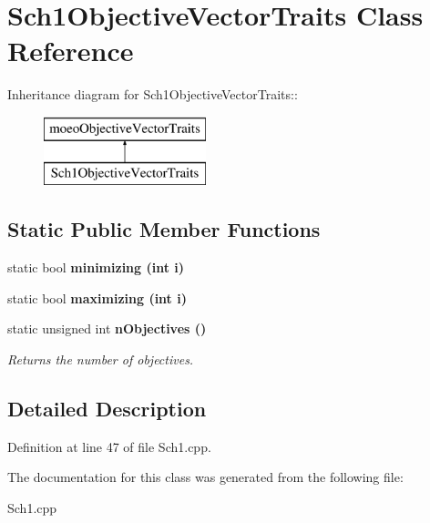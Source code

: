 \section{Sch1Objective\-Vector\-Traits Class Reference}
\label{classSch1ObjectiveVectorTraits}
Inheritance diagram for Sch1Objective\-Vector\-Traits::\begin{figure}[H]
\begin{center}
\leavevmode
\includegraphics[height=2cm]{classSch1ObjectiveVectorTraits}
\end{center}
\end{figure}
\subsection*{Static Public Member Functions}
\begin{CompactItemize}
\item 
static bool \bf{minimizing} (int i)\label{classSch1ObjectiveVectorTraits_455ac35e419ad21c0a4ba4bbd2768ca5}

\item 
static bool \bf{maximizing} (int i)\label{classSch1ObjectiveVectorTraits_a7de212f3346dde550757e8a412baa4d}

\item 
static unsigned int \bf{n\-Objectives} ()\label{classSch1ObjectiveVectorTraits_54ae04aa8eb052223778ecae175be95b}

\begin{CompactList}\small\item\em Returns the number of objectives. \item\end{CompactList}\end{CompactItemize}


\subsection{Detailed Description}




Definition at line 47 of file Sch1.cpp.

The documentation for this class was generated from the following file:\begin{CompactItemize}
\item 
Sch1.cpp\end{CompactItemize}
